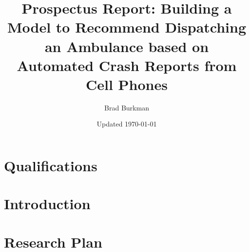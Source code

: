 \documentclass[11pt]{report}
\title{Prospectus Report:  Building a Model to Recommend Dispatching an Ambulance based on Automated Crash Reports from Cell Phones}
\author{Brad Burkman}
\date{Updated \today}
\begin{document}
\setlength{\parindent}{20pt}
\begin{spacing}{1.2}
\setcounter{chapter}{-1}


\maketitle




\newpage
\chapter{Qualifications}




\chapter{Introduction}







\setcounter{chapter}{9}
\chapter{Research Plan}





\end{spacing}
\end{document}
